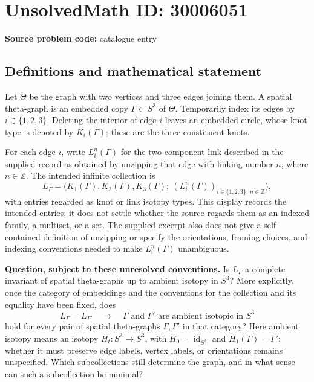 \documentclass[11pt]{article}
\newcommand{\Z}{\mathbb{Z}}
\begin{document}
\section*{UnsolvedMath ID: 30006051}
\textbf{Source problem code:} catalogue entry
\subsection{Definitions and mathematical statement}
Let \(\Theta\) be the graph with two vertices and three edges joining them. A spatial theta-graph is an embedded copy \(\Gamma\subset S^3\) of \(\Theta\). Temporarily index its edges by \(i\in\{1,2,3\}\). Deleting the interior of edge \(i\) leaves an embedded circle, whose knot type is denoted by \(K_i(\Gamma)\); these are the three constituent knots.

For each edge \(i\), write \(L_i^n(\Gamma)\) for the two-component link described in the supplied record as obtained by unzipping that edge with linking number \(n\), where \(n\in\Z\). The intended infinite collection is
\[
L_\Gamma=\bigl(K_1(\Gamma),K_2(\Gamma),K_3(\Gamma);\ (L_i^n(\Gamma))_{i\in\{1,2,3\},\,n\in\Z}\bigr),
\]
with entries regarded as knot or link isotopy types. This display records the intended entries; it does not settle whether the source regards them as an indexed family, a multiset, or a set. The supplied excerpt also does not give a self-contained definition of unzipping or specify the orientations, framing choices, and indexing conventions needed to make \(L_i^n(\Gamma)\) unambiguous.

\textbf{Question, subject to these unresolved conventions.} Is \(L_\Gamma\) a complete invariant of spatial theta-graphs up to ambient isotopy in \(S^3\)? More explicitly, once the category of embeddings and the conventions for the collection and its equality have been fixed, does
\[
L_\Gamma=L_{\Gamma'}
\quad\Longrightarrow\quad
\Gamma\text{ and }\Gamma'\text{ are ambient isotopic in }S^3
\]
hold for every pair of spatial theta-graphs \(\Gamma,\Gamma'\) in that category? Here ambient isotopy means an isotopy \(H_t:S^3\to S^3\), with \(H_0=\operatorname{id}_{S^3}\) and \(H_1(\Gamma)=\Gamma'\); whether it must preserve edge labels, vertex labels, or orientations remains unspecified. Which subcollections still determine the graph, and in what sense can such a subcollection be minimal?
\end{document}
